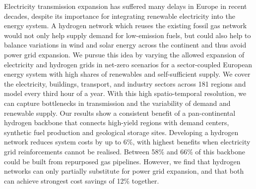 Electricity transmission expansion has suffered many delays in Europe in recent
decades, despite its importance for integrating renewable electricity into the
energy system. A hydrogen network  which reuses the existing fossil gas network
would not only help supply demand for low-emission fuels, but could also help to
balance variations in wind and solar energy across the continent and thus avoid
power grid expansion. We pursue this idea by varying the allowed expansion of
electricity and hydrogen grids in net-zero \co scenarios for a sector-coupled
European energy system with high shares of renewables and self-sufficient
supply. We cover the electricity, buildings, transport, and industry sectors
across 181 regions and model every third hour of a year. With this high
spatio-temporal resolution, we can capture bottlenecks in transmission and the
variability of demand and renewable supply. Our results show a consistent
benefit of a pan-continental hydrogen backbone that connects high-yield regions
with demand centers, synthetic fuel production and geological storage sites.
Developing a hydrogen network reduces system costs by up to 6\%, with highest
benefits when electricity grid reinforcements cannot be realised. Between 58\%
and 66\% of this backbone could be built from repurposed gas pipelines. However,
we find that hydrogen networks can only partially substitute for power grid
expansion, and that both can achieve strongest cost savings of 12\% together.
